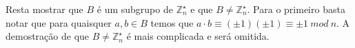 Resta mostrar que $B$ é um subgrupo de $\mathbb{Z}_n^\star$ e que $B \neq \mathbb{Z}_n^\star$.
Para o primeiro basta notar que para quaisquer $a,b \in B$ temos que $a \cdot b \equiv (\pm 1)(\pm 1) \equiv \pm 1\ mod\ n$.
A demostração de que $B \neq \mathbb{Z}_n^\star$ é mais complicada e será omitida.




